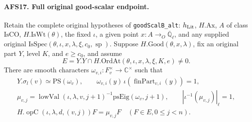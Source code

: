 \paragraph{AFS17. Full original good-scalar endpoint.}
\label{claim:AFS17}
Retain the complete original hypotheses of
\texttt{goodScalB\_alt}: $h_{\rm Lit}$, $H.\mathrm{Ax}$,
$A$ of class $\mathrm{IsCO}$, $H.\mathrm{IsWt}(\theta)$,
the fixed $\iota$, a given point $x:A\to_O
\overline{\mathbb Q}_\ell$, and any supplied original
$\mathrm{IsSpec}(\theta,\iota,x,\lambda,\xi,c_0,\operatorname{sp})$.
Suppose $H.\mathrm{Good}(\theta,x,\lambda)$, fix an original
part $Y$, level $K$, and $e\geq c_0$, and assume
\[
 E=Y.Y\cap H.\mathrm{OrdAt}(\theta,\iota,x,\lambda,\xi,K,e)
                                                        \ne0.
\]
There are smooth characters $\omega_{v,i}:F_v^\times\to
\mathbb C^\times$ such that
\begin{gather*}
 Y.\sigma_l(v)\simeq\mathrm{PS}(\omega_v),\qquad
 \omega_{v,i}(y)\,
       \iota(\operatorname{finPart}_{v,i}(y))=1,\\
 \mu_{v,j}=\operatorname{lowVal}(\iota,\lambda,v,j+1)^{-1}
                         \mathrm{psEig}(\omega_v,j+1),\qquad
 |\iota^{-1}(\mu_{v,j})|_\ell=1,\\
 H.\operatorname{opC}(\iota,\lambda,d,(v,j))F
                   =\mu_{v,j}F\quad(F\in E, 0\leq j<n).
\end{gather*}
